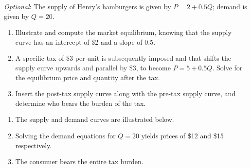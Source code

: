 \begin{enumialphparenastyle}
\begin{econex}\label{ex:ch4ex11}
\textit{Optional}: The supply of Henry's hamburgers is given by $P=2+0.5Q$; demand is given by $Q=20$.
\begin{enumerate}
\item	Illustrate and compute the market equilibrium, knowing that the supply curve has an intercept of \$2 and a slope of 0.5.
\item	A specific tax of \$3 per unit is subsequently imposed and that shifts the supply curve upwards and parallel by \$3, to become $P=5+0.5Q$. Solve for the equilibrium price and quantity after the tax. 
\item	Insert the post-tax supply curve along with the pre-tax supply curve, and determine who bears the burden of the tax.
\end{enumerate}
\begin{econsolution}
\begin{enumerate}
\item	The supply and demand curves are illustrated below.
\item	Solving the demand equations for $Q=20$ yields prices of \$12 and \$15 respectively.
\item	The consumer bears the entire tax burden.
\end{enumerate}
\begin{center*}
\end{center*}
\end{econsolution}
\end{econex}

\end{enumialphparenastyle}
